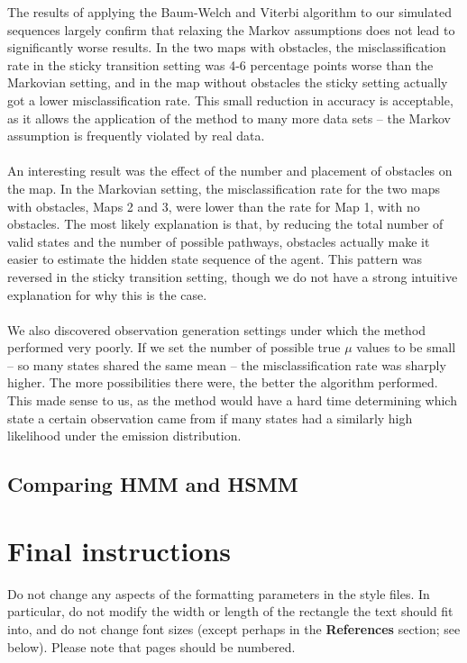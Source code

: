 \documentclass{article}
\begin{document}
The results of applying the Baum-Welch and Viterbi algorithm to our simulated sequences largely confirm that relaxing the Markov assumptions does not lead to significantly worse results. In the two maps with obstacles, the misclassification rate in the sticky transition setting was 4-6 percentage points worse than the Markovian setting, and in the map without obstacles the sticky setting actually got a lower misclassification rate. This small reduction in accuracy is acceptable, as it allows the application of the method to many more data sets -- the Markov assumption is frequently violated by real data.\\
\\
An interesting result was the effect of the number and placement of obstacles on the map. In the Markovian setting, the misclassification rate for the two maps with obstacles, Maps 2 and 3, were lower than the rate for Map 1, with no obstacles. The most likely explanation is that, by reducing the total number of valid states and the number of possible pathways, obstacles actually make it easier to estimate the hidden state sequence of the agent. This pattern was reversed in the sticky transition setting, though we do not have a strong intuitive explanation for why this is the case. \\
\\
We also discovered observation generation settings under which the method performed very poorly. If we set the number of possible true $\mu$ values to be small -- so many states shared the same mean -- the misclassification rate was sharply higher. The more possibilities there were, the better the algorithm performed. This made sense to us, as the method would have a hard time determining which state a certain observation came from if many states had a similarly high likelihood under the emission distribution.



\subsection{Comparing HMM and HSMM}




\section{Final instructions}

Do not change any aspects of the formatting parameters in the style files.  In
particular, do not modify the width or length of the rectangle the text should
fit into, and do not change font sizes (except perhaps in the
\textbf{References} section; see below). Please note that pages should be
numbered.
\end{document}
